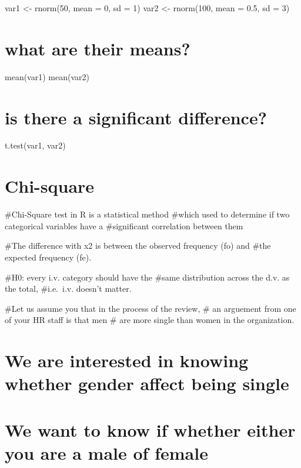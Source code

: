 \documentclass[
]{article}
\begin{document}
var1 \textless- rnorm(50, mean = 0, sd = 1) var2 \textless- rnorm(100,
mean = 0.5, sd = 3)

\hypertarget{what-are-their-means}{%
\section{what are their means?}\label{what-are-their-means}}

mean(var1) mean(var2)

\hypertarget{is-there-a-significant-difference}{%
\section{is there a significant
difference?}\label{is-there-a-significant-difference}}

t.test(var1, var2)

\hypertarget{chi-square}{%
\section{Chi-square}\label{chi-square}}

\#Chi-Square test in R is a statistical method \#which used to determine
if two categorical variables have a \#significant correlation between
them

\#The difference with x2 is between the observed frequency (fo) and
\#the expected frequency (fe).

\#H0: every i.v. category should have the \#same distribution across the
d.v. as the total, \#i.e.~i.v. doesn't matter.

\#Let us assume you that in the process of the review, \# an arguement
from one of your HR staff is that men \# are more single than women in
the organization.

\hypertarget{we-are-interested-in-knowing-whether-gender-affect-being-single}{%
\section{We are interested in knowing whether gender affect being
single}\label{we-are-interested-in-knowing-whether-gender-affect-being-single}}

\hypertarget{we-want-to-know-if-whether-either-you-are-a-male-of-female}{%
\section{We want to know if whether either you are a male of
female}\label{we-want-to-know-if-whether-either-you-are-a-male-of-female}}
\end{document}
